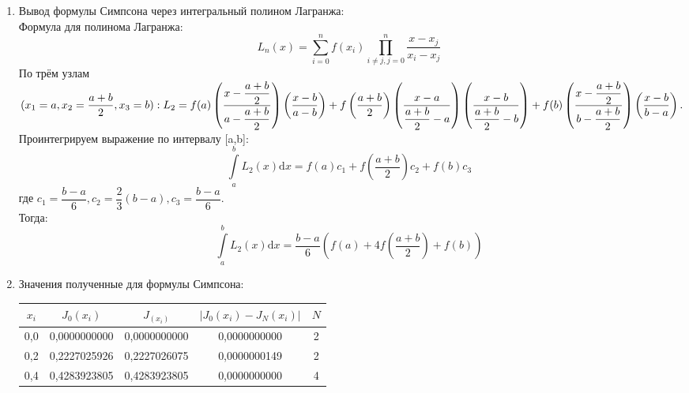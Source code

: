 \documentclass[a4paper,12pt]{article}
\begin{document}
{\begin{enumerate}[label = \arabic*.]
        \begin{enumerate}
            \item {Вывод формулы Симпсона через интегральный полином Лагранжа:\\
            Формула для полинома Лагранжа:
            \begin{equation}
                L_n(x) = \sum_{i=0}^{n}f(x_i)\prod_{i \ne j, j = 0}^{n}\frac{x - x_j}{x_i - x_j}
            \end{equation}
            По трём узлам $(x_1 = a, x_2 = \dfrac{a+b}{2}, x_3 = b):
            L_2 = f(a)\left(\dfrac{x - \dfrac{a+b}{2}}{a - \dfrac{a+b}{2}}\right)\left(\dfrac{x - b}{a - b}\right)+\\
            f\left(\dfrac{a +b}{2}\right)\left(\dfrac{x-a}{\dfrac{a+b}{2} - a}\right)\left(\dfrac{x-b}{\dfrac{a+b}{2} - b}\right)+ f(b)\left(\dfrac{x - \dfrac{a+b}{2}}{b - \dfrac{a+b}{2}}\right)\left(\dfrac{x - b}{b - a}\right).$\\
            \hfill\break
            Проинтегрируем выражение по интервалу [a,b]:
            \begin{equation}
                \int\limits_{a}^{b}L_2(x)\mathrm{d}x = f(a)c_1 + f\left(\frac{a+b}{2}\right)c_2 + f(b)c_3
            \end{equation}
            где $c_1 = \dfrac{b-a}{6}, c_2 = \dfrac{2}{3}(b - a), c_3 = \dfrac{b-a}{6}.$\\
            \hfill\break
            Тогда:
            \begin{equation}
                \int\limits_{a}^{b}L_2(x)\mathrm{d}x = \frac{b-a}{6}\left(f(a) + 4f\left(\frac{a+b}{2}\right)+f(b)\right)
            \end{equation}
            \clearpage
            }
            \item {Значения полученные для формулы Симпсона:
            \begin{table}[h]
            \centering
            \begin{tabular}{|c|c|c|c|c|}
                \hline
                $x_i$ & $J_0(x_i)$ & $J_(x_i)$ & $\left|J_0(x_i) - J_N(x_i)\right|$ & $N$\\
                \hline
                0,0 & 0,0000000000 & 0,0000000000 & 0,0000000000 & 2\\
                \hline
                0,2 & 0,2227025926 & 0,2227026075 & 0,0000000149 & 2\\
                \hline
                0,4 & 0,4283923805 & 0,4283923805 & 0,0000000000 & 4\\

\end{tabular}
\end{table}}
\end{enumerate}
\end{enumerate}}
\end{document}
